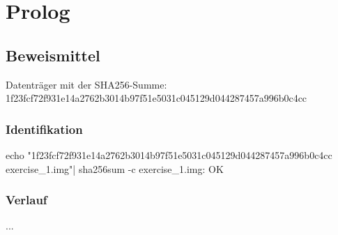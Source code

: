 \chapter{Prolog}

\section{Beweismittel}

Datenträger mit der SHA256-Summe:\\ 
1f23fcf72f931e14a2762b3014b97f51e5031c045129d044287457a996b0c4cc

\subsection{Identifikation}

echo "1f23fcf72f931e14a2762b3014b97f51e5031c045129d044287457a996b0c4cc exercise_1.img"| sha256sum -c 
exercise_1.img: OK

\subsection{Verlauf}

...

